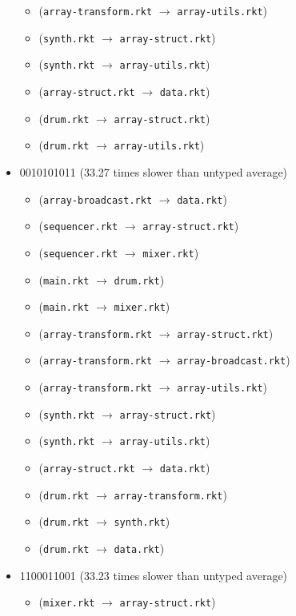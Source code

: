 \documentclass{article}
\newcommand{\mono}[1]{\texttt{#1}}
\begin{document}
\begin{itemize}
\begin{itemize}
  \item (\mono{array-transform.rkt} $\rightarrow$ \mono{array-utils.rkt})
  \item (\mono{synth.rkt} $\rightarrow$ \mono{array-struct.rkt})
  \item (\mono{synth.rkt} $\rightarrow$ \mono{array-utils.rkt})
  \item (\mono{array-struct.rkt} $\rightarrow$ \mono{data.rkt})
  \item (\mono{drum.rkt} $\rightarrow$ \mono{array-struct.rkt})
  \item (\mono{drum.rkt} $\rightarrow$ \mono{array-utils.rkt})
  \end{itemize}
\item 0010101011 (33.27 times slower than untyped average)
  \begin{itemize}
  \item (\mono{array-broadcast.rkt} $\rightarrow$ \mono{data.rkt})
  \item (\mono{sequencer.rkt} $\rightarrow$ \mono{array-struct.rkt})
  \item (\mono{sequencer.rkt} $\rightarrow$ \mono{mixer.rkt})
  \item (\mono{main.rkt} $\rightarrow$ \mono{drum.rkt})
  \item (\mono{main.rkt} $\rightarrow$ \mono{mixer.rkt})
  \item (\mono{array-transform.rkt} $\rightarrow$ \mono{array-struct.rkt})
  \item (\mono{array-transform.rkt} $\rightarrow$ \mono{array-broadcast.rkt})
  \item (\mono{array-transform.rkt} $\rightarrow$ \mono{array-utils.rkt})
  \item (\mono{synth.rkt} $\rightarrow$ \mono{array-struct.rkt})
  \item (\mono{synth.rkt} $\rightarrow$ \mono{array-utils.rkt})
  \item (\mono{array-struct.rkt} $\rightarrow$ \mono{data.rkt})
  \item (\mono{drum.rkt} $\rightarrow$ \mono{array-transform.rkt})
  \item (\mono{drum.rkt} $\rightarrow$ \mono{synth.rkt})
  \item (\mono{drum.rkt} $\rightarrow$ \mono{data.rkt})
  \end{itemize}
\item 1100011001 (33.23 times slower than untyped average)
  \begin{itemize}
  \item (\mono{mixer.rkt} $\rightarrow$ \mono{array-struct.rkt})

\end{itemize}
\end{itemize}
\end{document}

